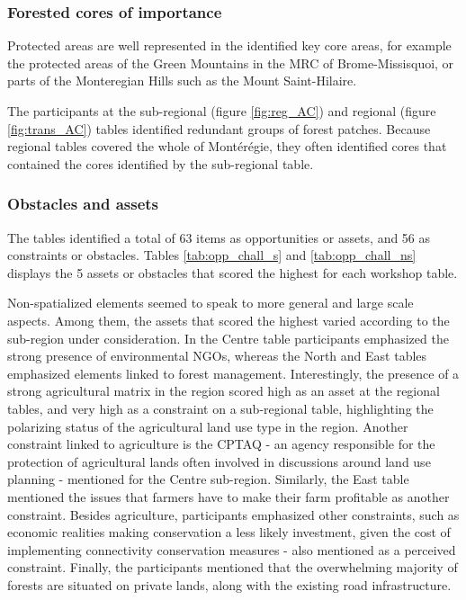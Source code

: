 \subsubsection{Forested cores of importance} 

Protected areas are well represented in the identified key core areas, for example the protected areas of the Green Mountains in the MRC of Brome-Missisquoi, or parts of the Monteregian Hills such as the Mount Saint-Hilaire. 

The participants at the sub-regional (figure \ref{fig:reg_AC}) and regional (figure \ref{fig:trans_AC}) tables identified redundant groups of forest patches. Because regional tables covered the whole of Montérégie, they often identified cores that contained the cores identified by the sub-regional table. \\

\subsubsection{Obstacles and assets}

The tables identified a total of 63 items as opportunities or assets, and 56 as constraints or obstacles. Tables \ref{tab:opp_chall_s} and \ref{tab:opp_chall_ns} displays the 5 assets or obstacles that scored the highest for each workshop table. 

Non-spatialized elements seemed to speak to more general and large scale aspects. Among them, the assets that scored the highest varied according to the sub-region under consideration. In the Centre table participants emphasized the strong presence of environmental NGOs, whereas the North and East tables emphasized elements linked to forest management. Interestingly, the presence of a strong agricultural matrix in the region scored high as an asset at the regional tables, and very high as a constraint on a sub-regional table, highlighting the polarizing status of the agricultural land use type in the region. Another constraint linked to agriculture is the CPTAQ - an agency responsible for the protection of agricultural lands often involved in discussions around land use planning - mentioned for the Centre sub-region. Similarly, the East table mentioned the issues that farmers have to make their farm profitable as another constraint. Besides agriculture, participants emphasized other constraints, such as economic realities making conservation a less likely investment, given the cost of implementing connectivity conservation measures - also mentioned as a perceived constraint. Finally, the participants mentioned that the overwhelming majority of forests are situated on private lands, along with the existing road infrastructure.


